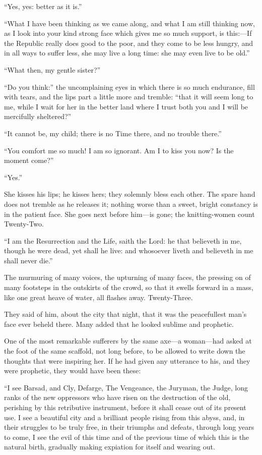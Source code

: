 ``Yes, yes:  better as it is.''

``What I have been thinking as we came along, and what I am still
thinking now, as I look into your kind strong face which gives me so
much support, is this:---If the Republic really does good to the poor,
and they come to be less hungry, and in all ways to suffer less, she
may live a long time:  she may even live to be old.''

``What then, my gentle sister?''

``Do you think:'' the uncomplaining eyes in which there is so much
endurance, fill with tears, and the lips part a little more and
tremble:  ``that it will seem long to me, while I wait for her in the
better land where I trust both you and I will be mercifully sheltered?''

``It cannot be, my child; there is no Time there, and no trouble
there.''

``You comfort me so much!  I am so ignorant.  Am I to kiss you now?
Is the moment come?''

``Yes.''

She kisses his lips; he kisses hers; they solemnly bless each other.
The spare hand does not tremble as he releases it; nothing worse than
a sweet, bright constancy is in the patient face.  She goes next
before him---is gone; the knitting-women count Twenty-Two.

``I am the Resurrection and the Life, saith the Lord:
he that believeth in me, though he were dead, yet shall he live:
and whosoever liveth and believeth in me shall never die.''

The murmuring of many voices, the upturning of many faces,
the pressing on of many footsteps in the outskirts of the crowd,
so that it swells forward in a mass, like one great heave of water,
all flashes away. Twenty-Three.



They said of him, about the city that night, that it was the
peacefullest man's face ever beheld there.  Many added that he looked
sublime and prophetic.

One of the most remarkable sufferers by the same axe---a woman---had
asked at the foot of the same scaffold, not long before, to be
allowed to write down the thoughts that were inspiring her.  If he
had given any utterance to his, and they were prophetic, they would
have been these:

``I see Barsad, and Cly, Defarge, The Vengeance, the Juryman, the
Judge, long ranks of the new oppressors who have risen on the
destruction of the old, perishing by this retributive instrument,
before it shall cease out of its present use.  I see a beautiful city
and a brilliant people rising from this abyss, and, in their struggles
to be truly free, in their triumphs and defeats, through long years
to come, I see the evil of this time and of the previous time of
which this is the natural birth, gradually making expiation for
itself and wearing out.

